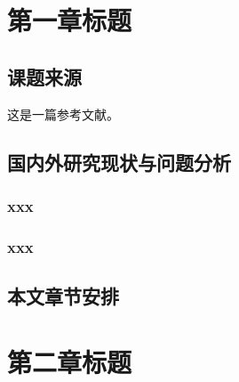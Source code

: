 \documentclass[UTF8]{ctexart}
\numberwithin{equation}{section} %
\numberwithin{table}{section} %
\begin{document}
\linespread{1.6} \selectfont  %


\setcounter{page}{7}  %

{\hypersetup{linkcolor=black}
\tableofcontents}
\pagebreak
{\hypersetup{linkcolor=black}
\renewcommand\listfigurename{图\;目\;录}
\listoffigures}
\pagebreak
{\hypersetup{linkcolor=black}
\renewcommand\listtablename{表\;目\;录}
\listoftables}

\pagebreak
\section{第一章标题}
\setcounter{page}{1}

\subsection{课题来源}
这是一篇参考文献\cite{zheng2013personalized}。
\subsection{国内外研究现状与问题分析}

\subsubsection{xxx}

\subsubsection{xxx}

\subsection{本文章节安排}

\newpage

\section{第二章标题}
\end{document}
